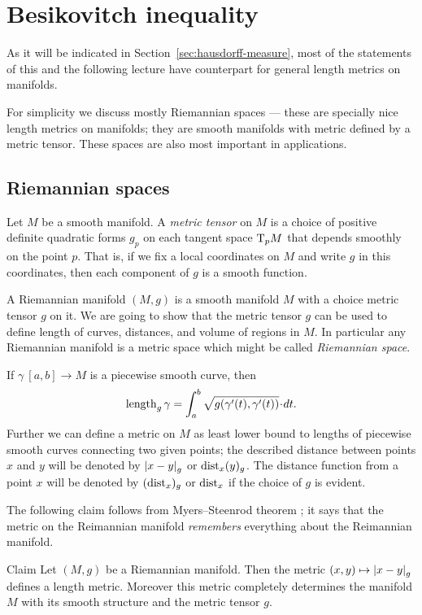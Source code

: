 \chapter{Besikovitch inequality} 

As it will be indicated in Section~\ref{sec:hausdorff-measure},
most of the statements of this and the following lecture have counterpart for general length metrics on manifolds.

For simplicity we discuss mostly Riemannian spaces --- these are specially nice length metrics on manifolds; they are smooth manifolds with metric defined by a metric tensor.
These spaces are also most important in applications.

\section{Riemannian spaces}


Let $M$ be a smooth manifold.
A \emph{metric tensor} on $M$ is a choice of positive definite quadratic forms $g_p$ on each tangent space $\mathrm{T}_pM$ that depends smoothly on the point $p$.
That is, if we fix a local coordinates on $M$ and write $g$ in this coordinates, then each component of $g$ is a smooth function. 

A Riemannian manifold $(M,g)$ is a smooth manifold $M$ with a choice metric tensor $g$ on it.
We are going to show that the metric tensor $g$ can be used to define length of curves, distances, and volume of regions in $M$.
In particular any Riemannian manifold is a metric space which might be called \emph{Riemannian space}.


If $\gamma\:[a,b]\to M$ is a piecewise smooth curve, then 
\[\length_g\gamma=\int_a^b\sqrt{g(\gamma'(t),\gamma'(t))}\cdot dt.\]
Further we can define a metric on $M$ as least lower bound to lengths of piecewise smooth curves connecting two given points;
the described distance between points $x$ and $y$ will be denoted by $\dist{x}{y}{g}$ or $\mathrm{dist}_x(y)_g$.
The distance function from a point $x$ will be denoted by $(\mathrm{dist}_x)_g$ or $\mathrm{dist}_x$ if the choice of $g$ is evident.

The following claim follows from Myers--Steenrod theorem \cite{myers-steenrod};
it says that the metric on the Reimannian manifold {}\emph{remembers} everything about the Reimannian manifold.

\begin{thm}{Claim}
Let $(M,g)$ be a Riemannian manifold.
Then the metric $(x,y)\mapsto \dist{x}{y}{g}$ defines a length metric. Moreover this metric completely determines the manifold $M$ with its smooth structure and the metric tensor $g$.
\end{thm}

